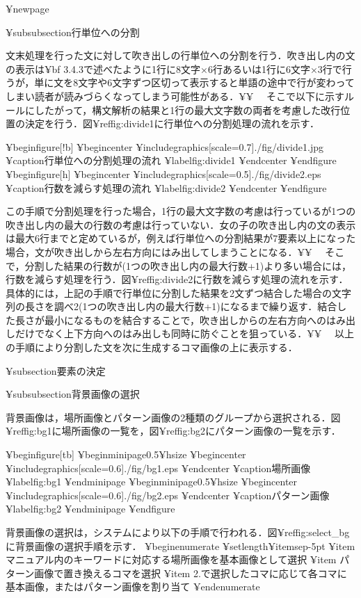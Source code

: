 ¥newpage

¥subsubsection{行単位への分割}

文末処理を行った文に対して吹き出しの行単位への分割を行う．吹き出し内の文の表示は{¥bf 3.4.3}で述べたように1行に8文字×6行あるいは1行に6文字×3行で行うが，単に文を8文字や6文字ずつ区切って表示すると単語の途中で行が変わってしまい読者が読みづらくなってしまう可能性がある．¥¥
　そこで以下に示すルールにしたがって，構文解析の結果と1行の最大文字数の両者を考慮した改行位置の決定を行う．図¥ref{fig:divide1}に行単位への分割処理の流れを示す．

¥begin{figure}[!b]
 ¥begin{center}
  ¥includegraphics[scale=0.7]{./fig/divide1.jpg}
  ¥caption{行単位への分割処理の流れ}
  ¥label{fig:divide1}
 ¥end{center}
¥end{figure}
¥begin{figure}[h]
 ¥begin{center}
  ¥includegraphics[scale=0.5]{./fig/divide2.eps}
  ¥caption{行数を減らす処理の流れ}
  ¥label{fig:divide2}
 ¥end{center}
¥end{figure}

この手順で分割処理を行った場合，1行の最大文字数の考慮は行っているが1つの吹き出し内の最大の行数の考慮は行っていない．女の子の吹き出し内の文の表示は最大6行までと定めているが，例えば行単位への分割結果が7要素以上になった場合，文が吹き出しから左右方向にはみ出してしまうことになる．¥¥
　そこで，分割した結果の行数が(1つの吹き出し内の最大行数+1)より多い場合には，行数を減らす処理を行う．図¥ref{fig:divide2}に行数を減らす処理の流れを示す．具体的には，上記の手順で行単位に分割した結果を2文ずつ結合した場合の文字列の長さを調べ2(1つの吹き出し内の最大行数+1)になるまで繰り返す．結合した長さが最小になるものを結合することで，吹き出しからの左右方向へのはみ出しだけでなく上下方向へのはみ出しも同時に防ぐことを狙っている．¥¥
　以上の手順により分割した文を次に生成するコマ画像の上に表示する．

¥subsection{要素の決定}

¥subsubsection{背景画像の選択}

背景画像は，場所画像とパターン画像の2種類のグループから選択される．図¥ref{fig:bg1}に場所画像の一覧を，図¥ref{fig:bg2}にパターン画像の一覧を示す．

¥begin{figure}[tb]
 ¥begin{minipage}{0.5¥hsize}
  ¥begin{center}
   ¥includegraphics[scale=0.6]{./fig/bg1.eps}
  ¥end{center}
  ¥caption{場所画像}
  ¥label{fig:bg1}
 ¥end{minipage}
 ¥begin{minipage}{0.5¥hsize}
  ¥begin{center}
   ¥includegraphics[scale=0.6]{./fig/bg2.eps}
  ¥end{center}
  ¥caption{パターン画像}
  ¥label{fig:bg2}
 ¥end{minipage}
¥end{figure}

背景画像の選択は，システムにより以下の手順で行われる．図¥ref{fig:select_bg}に背景画像の選択手順を示す．
¥begin{enumerate}
¥setlength{¥itemsep}{-5pt}
¥item マニュアル内のキーワードに対応する場所画像を基本画像として選択
¥item パターン画像で置き換えるコマを選択
¥item 2.で選択したコマに応じて各コマに基本画像，またはパターン画像を割り当て
¥end{enumerate}


